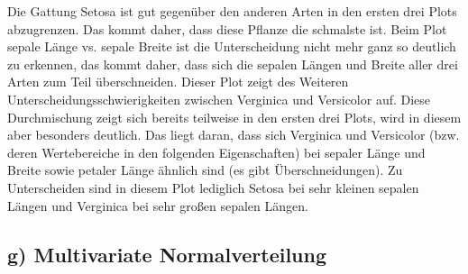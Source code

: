 \documentclass{scrartcl}
\begin{document}
Die Gattung Setosa ist gut gegenüber den anderen Arten in den ersten drei Plots abzugrenzen.
Das kommt daher, dass diese Pflanze die schmalste ist. 
Beim Plot sepale Länge vs. sepale Breite ist die Unterscheidung nicht mehr ganz so deutlich zu erkennen, das kommt daher, dass sich die sepalen Längen und Breite aller drei Arten zum Teil überschneiden.
Dieser Plot zeigt des Weiteren Unterscheidungsschwierigkeiten zwischen Verginica und Versicolor auf. 
Diese Durchmischung zeigt sich bereits teilweise in den ersten drei Plots, wird in diesem aber besonders deutlich. 
Das liegt daran, dass sich Verginica und Versicolor (bzw. deren Wertebereiche in den folgenden Eigenschaften) bei sepaler Länge und Breite sowie petaler Länge ähnlich sind (es gibt Überschneidungen). Zu Unterscheiden sind in diesem Plot lediglich Setosa bei sehr kleinen sepalen Längen und Verginica bei sehr großen sepalen Längen.



\subsection*{g) Multivariate Normalverteilung}
\end{document}
